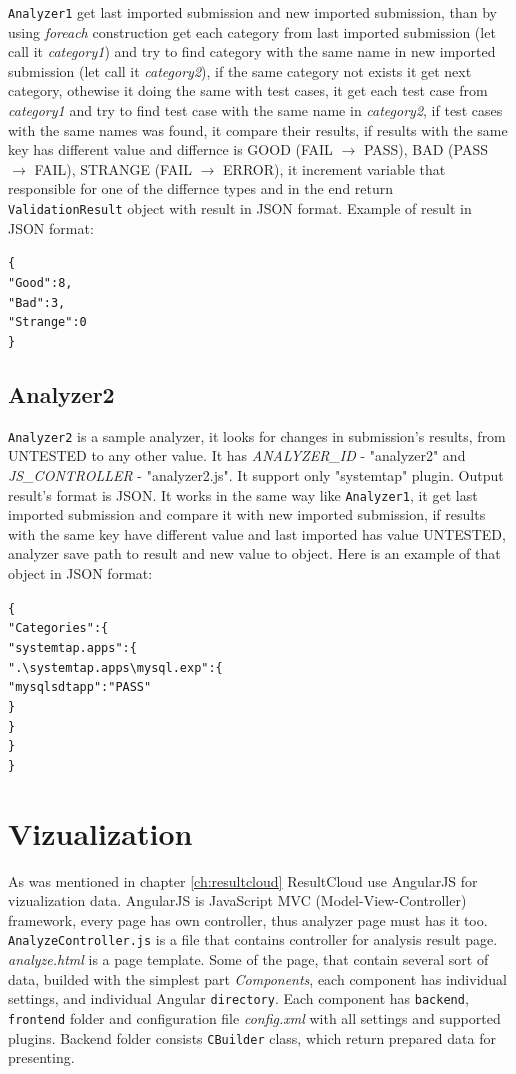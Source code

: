 \texttt{Analyzer1} get last imported submission and new imported submission, than by using \emph{foreach} construction get each category from last imported submission (let call it \emph{category1}) and try to find category with the same name in new imported submission (let call it \emph{category2}), if the same category not exists it get next category, othewise it doing the same with test cases, it get each test case from \emph{category1} and try to find test case with the same name in \emph{category2}, if test cases with the same names was found, it compare their results, if results with the same key has different value and differnce is GOOD (FAIL $\rightarrow$ PASS), BAD (PASS $\rightarrow$ FAIL), STRANGE (FAIL $\rightarrow$ ERROR), it increment variable that responsible for one of the differnce types and in the end return \texttt{ValidationResult} object with result in JSON format. Example of result in JSON format:
\begin{alltt}
\{
    "Good": 8,
    "Bad": 3,
    "Strange": 0
\}
\end{alltt}

\subsection{Analyzer2}

\texttt{Analyzer2} is a sample analyzer, it looks for changes in submission's results, from UNTESTED to any other value. It has \emph{ANALYZER\_ID} - "analyzer2" and \emph{JS\_CONTROLLER} - "analyzer2.js". It support only "systemtap" plugin. Output result's format is JSON. It works in the same way like \texttt{Analyzer1}, it get last imported submission and compare it with new imported submission, if results with the same key have different value and last imported has value UNTESTED, analyzer save path to result and new value to object. Here is an example of that object in JSON format:
\begin{alltt}
\{
    "Categories": \{
        "systemtap.apps": \{
            ".\textbackslash{}systemtap.apps\textbackslash{}mysql.exp": \{
                "mysql sdt app": "PASS"
            \}
        \}
    \}
\}
\end{alltt}

\section{Vizualization}

As was mentioned in chapter \ref{ch:resultcloud} ResultCloud use AngularJS for vizualization data. AngularJS is JavaScript MVC (Model-View-Controller) framework, every page has own controller, thus analyzer page must has it too. \texttt{AnalyzeController.js} is a file that contains controller for analysis result page. \emph{analyze.html} is a page template. Some of the page, that contain several sort of data, builded with the simplest part \emph{Components}, each component has individual settings, and individual Angular \texttt{directory}. Each component has \texttt{backend}, \texttt{frontend} folder and configuration file \emph{config.xml} with all settings and supported plugins. Backend folder consists \texttt{CBuilder} class, which return prepared data for presenting. 

